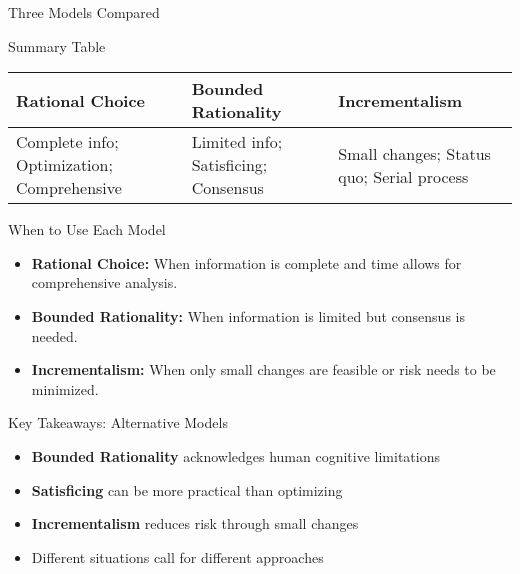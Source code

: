 \documentclass[10pt]{beamer}
\begin{document}
\begin{frame}{Three Models Compared}
\begin{block}{Summary Table}
\begin{tabularx}{\textwidth}{X|X|X}
\textbf{Rational Choice} & \textbf{Bounded Rationality} & \textbf{Incrementalism} \\
\hline
Complete info; Optimization; Comprehensive & Limited info; Satisficing; Consensus & Small changes; Status quo; Serial process \\
\end{tabularx}
\end{block}
\end{frame}

\begin{frame}{When to Use Each Model}
\begin{itemize}
\item \textbf{Rational Choice:} When information is complete and time allows for comprehensive analysis.
\item \textbf{Bounded Rationality:} When information is limited but consensus is needed.
\item \textbf{Incrementalism:} When only small changes are feasible or risk needs to be minimized.
\end{itemize}
\end{frame}

\begin{frame}{Key Takeaways: Alternative Models}
\begin{itemize}
\item \textbf{Bounded Rationality} acknowledges human cognitive limitations
\item \textbf{Satisficing} can be more practical than optimizing
\item \textbf{Incrementalism} reduces risk through small changes
\item Different situations call for different approaches
\end{itemize}
\end{frame}

\end{document}
